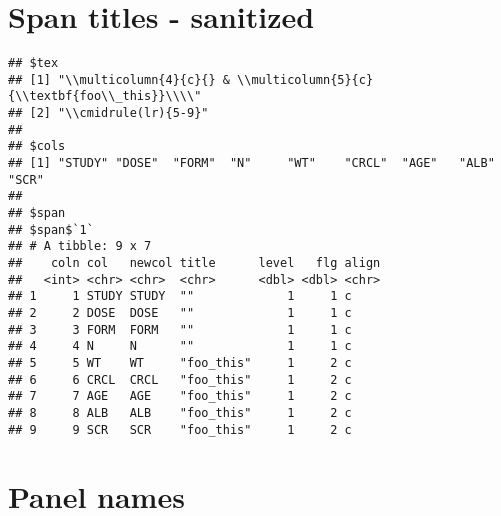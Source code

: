 \documentclass[
]{article}
\newenvironment{Shaded}{\begin{snugshade}}{\end{snugshade}}
\newcommand{\DataTypeTok}[1]{\textcolor[rgb]{0.13,0.29,0.53}{#1}}
\newcommand{\KeywordTok}[1]{\textcolor[rgb]{0.13,0.29,0.53}{\textbf{#1}}}
\newcommand{\NormalTok}[1]{#1}
\newcommand{\OperatorTok}[1]{\textcolor[rgb]{0.81,0.36,0.00}{\textbf{#1}}}
\newcommand{\OtherTok}[1]{\textcolor[rgb]{0.56,0.35,0.01}{#1}}
\newcommand{\StringTok}[1]{\textcolor[rgb]{0.31,0.60,0.02}{#1}}
\begin{document}
\hypertarget{span-titles---sanitized}{%
\section{Span titles - sanitized}\label{span-titles---sanitized}}

\begin{Shaded}
\end{Shaded}

\begin{verbatim}
## $tex
## [1] "\\multicolumn{4}{c}{} & \\multicolumn{5}{c}{\\textbf{foo\\_this}}\\\\"
## [2] "\\cmidrule(lr){5-9}"                                                  
## 
## $cols
## [1] "STUDY" "DOSE"  "FORM"  "N"     "WT"    "CRCL"  "AGE"   "ALB"   "SCR"  
## 
## $span
## $span$`1`
## # A tibble: 9 x 7
##    coln col   newcol title      level   flg align
##   <int> <chr> <chr>  <chr>      <dbl> <dbl> <chr>
## 1     1 STUDY STUDY  ""             1     1 c    
## 2     2 DOSE  DOSE   ""             1     1 c    
## 3     3 FORM  FORM   ""             1     1 c    
## 4     4 N     N      ""             1     1 c    
## 5     5 WT    WT     "foo_this"     1     2 c    
## 6     6 CRCL  CRCL   "foo_this"     1     2 c    
## 7     7 AGE   AGE    "foo_this"     1     2 c    
## 8     8 ALB   ALB    "foo_this"     1     2 c    
## 9     9 SCR   SCR    "foo_this"     1     2 c
\end{verbatim}

\hypertarget{panel-names}{%
\section{Panel names}\label{panel-names}}
\end{document}
